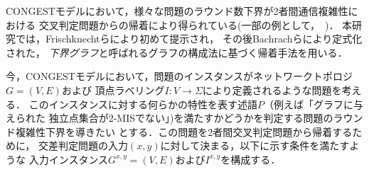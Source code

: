 \documentclass[12pt]{thesis}
\newcommand{\CONGEST}{\textsf{CONGEST}}
\theoremstyle{definition}
\begin{document}
{\CONGEST}モデルにおいて，様々な問題のラウンド数下界が2者間通信複雑性における
交叉判定問題からの帰着により得られている(一部の例として，~\cite{sarma2012distributed,fischer2018possibilities,czumaj2020detecting})．
本研究では，Frischknechtら\cite{frischknecht2012networks}により初めて提示され，
その後Bachrachら\cite{bacrach2019hardness}により定式化された，
\emph{下界グラフ}と呼ばれるグラフの構成法に基づく帰着手法を用いる．

今，{\CONGEST}モデルにおいて，問題のインスタンスがネットワークトポロジ$G = (V, E)$および
頂点ラベリング$I : V \to \Sigma$により定義されるような問題を考える．
このインスタンスに対する何らかの特性を表す述語$P$（例えば「グラフに与えられた
独立点集合が2-MISでない」)を満たすかどうかを判定する問題のラウンド複雑性下界を導きたい
とする．この問題を2者間交叉判定問題から帰着するために，
交差判定問題の入力$(x, y)$に対して決まる，以下に示す条件を満たすような
入力インスタンス$G^{x, y} = (V, E)$および$I^{x, y}$を構成する．
\end{document}
